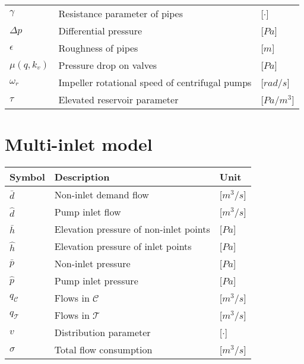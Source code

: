 \begin{tabular}{l l l}
	$\gamma$			&	Resistance parameter of pipes 						& \hspace{25mm}[$\cdot$]\\	
	$\Delta p$			&	Differential pressure 						    	& \hspace{25mm}[$Pa$]\\
	$\epsilon$			&	Roughness of pipes 						    		& \hspace{25mm}[$m$]\\	
	$\mu(q,k_v)$		&	Pressure drop on valves 						   	& \hspace{25mm}[$Pa$]\\
	$\omega_r$			&	Impeller rotational speed of centrifugal pumps 		& \hspace{25mm}[$rad/s$]\\
	$\tau$				&	Elevated reservoir parameter 			 			& \hspace{25mm}[$Pa/m^3$]\\	
\end{tabular}

\section*{Multi-inlet model}

\begin{tabular}{l l l} 
	\textbf{Symbol}		&	\textbf{Description}							& \hspace{44mm}\textbf{Unit}			\\\hline	

	$\bar{d}$			&	Non-inlet demand flow						    & \hspace{44mm}[$m^3/s$]\\
	$\hat{d}$			&	Pump inlet flow									& \hspace{44mm}[$m^3/s$]\\
	$\bar{h}$			&	Elevation pressure of non-inlet points		    & \hspace{44mm}[$Pa$]\\
	$\hat{h}$			&	Elevation pressure of inlet points				& \hspace{44mm}[$Pa$]\\
	$\bar{p}$			&	Non-inlet pressure				    			& \hspace{44mm}[$Pa$]\\
	$\hat{p}$			&	Pump inlet pressure								& \hspace{44mm}[$Pa$]\\
	$q_{\mathcal{C}}$	&	Flows in $\mathcal{C}$						    & \hspace{44mm}[$m^3/s$]\\
	$q_{\mathcal{T}}$	&	Flows in $\mathcal{T}$						    & \hspace{44mm}[$m^3/s$]\\
	$v$					&	Distribution parameter					    	& \hspace{44mm}[$\cdot$]\\
	$\sigma$			&	Total flow consumption						    & \hspace{44mm}[$m^3/s$]\\

\end{tabular}

